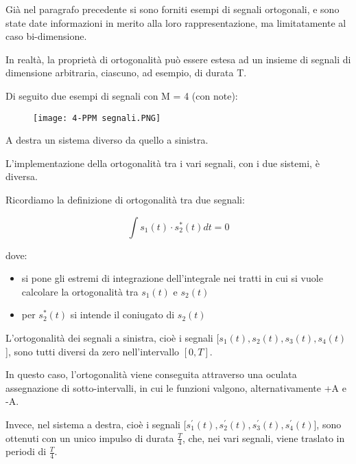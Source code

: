 Già nel paragrafo precedente si sono forniti esempi di segnali ortogonali, 
e sono state date informazioni in merito alla loro rappresentazione, 
ma limitatamente al caso bi-dimensione. \newline 

In realtà, la proprietà di ortogonalità può essere estesa ad un insieme di segnali di dimensione arbitraria, 
ciascuno, ad esempio, di durata T. \newline 

Di seguito due esempi di segnali con M = 4 (con note): 

\begin{figure}[h]
    \centering
    \texttt{[image: 4-PPM segnali.PNG]}
\end{figure} 

A destra un sistema diverso da quello a sinistra. \newline 

L'implementazione della ortogonalità tra i vari segnali, 
con i due sistemi, è diversa. \newline 

Ricordiamo la definizione di ortogonalità tra due segnali: 

{
    \Large 
    \begin{equation}
        \int 
        s_1 (t) \cdot s_2^{*} (t) dt 
        = 
        0
    \end{equation}
}

dove: 

\begin{itemize}
    \item si pone gli estremi di integrazione dell'integrale nei tratti in cui si vuole calcolare la ortogonalità tra $s_1 (t)$ e $s_2 (t)$ 
    \item per $s_2^{*} (t)$ si intende il coniugato di $s_2(t)$
\end{itemize}

L'ortogonalità dei segnali a sinistra, cioè i segnali [$s_1 (t), s_2 (t), s_3 (t), s_4 (t)$], 
sono tutti diversi da zero nell'intervallo $[0, T]$. \newline 

In questo caso, l'ortogonalità viene conseguita attraverso una oculata assegnazione di sotto-intervalli, 
in cui le funzioni valgono, alternativamente +A e -A. \newline 

Invece, nel sistema a destra, cioè i segnali [$s_1^{'} (t), s_2^{'} (t), s_3^{'} (t), s_4^{'} (t)$], 
sono ottenuti con un unico impulso di durata $\frac{T}{4}$, che, nei vari segnali, viene traslato in periodi di $\frac{T}{4}$. \newline 


